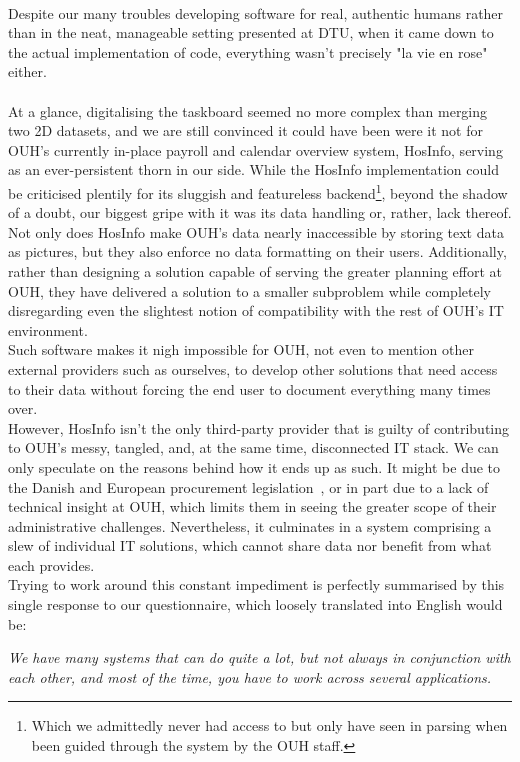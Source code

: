 \\
Despite our many troubles developing software for real, authentic humans rather than in the neat, manageable setting presented at DTU, when it came down to the actual implementation of code, everything wasn't precisely "la vie en rose" either.
\\
\\
At a glance, digitalising the taskboard seemed no more complex than merging two 2D datasets, and we are still convinced it could have been were it not for OUH's currently in-place payroll and calendar overview system, HosInfo, serving as an ever-persistent thorn in our side. While the HosInfo implementation could be criticised plentily for its sluggish and featureless backend\footnote{Which we admittedly never had access to but only have seen in parsing when been guided through the system by the OUH staff.}, beyond the shadow of a doubt, our biggest gripe with it was its data handling or, rather, lack thereof. Not only does HosInfo make OUH's data nearly inaccessible by storing text data as pictures, but they also enforce no data formatting on their users. Additionally, rather than designing a solution capable of serving the greater planning effort at OUH, they have delivered a solution to a smaller subproblem while completely disregarding even the slightest notion of compatibility with the rest of OUH's IT environment.
\\
Such software makes it nigh impossible for OUH, not even to mention other external providers such as ourselves, to develop other solutions that need access to their data without forcing the end user to document everything many times over.
\\ 
However, HosInfo isn't the only third-party provider that is guilty of contributing to OUH's messy, tangled, and, at the same time, disconnected IT stack. We can only speculate on the reasons behind how it ends up as such. It might be due to the Danish and European procurement legislation~\cite{Udbudsloven, EU-Procurement-Legislation}, or in part due to a lack of technical insight at OUH, which limits them in seeing the greater scope of their administrative challenges. Nevertheless, it culminates in a system comprising a slew of individual IT solutions, which cannot share data nor benefit from what each provides.
\\
Trying to work around this constant impediment is perfectly summarised by this single response to our questionnaire, which loosely translated into English would be:
\begin{center}
 \textit{We have many systems that can do quite a lot, but not always in conjunction with each other, and most of the time, you have to work across several applications.}
\end{center}
